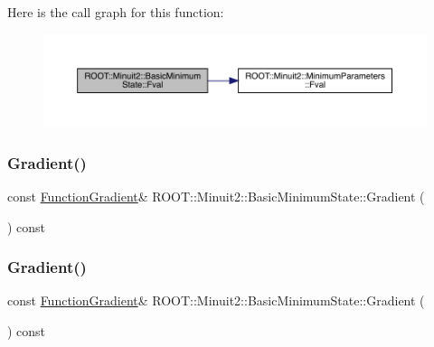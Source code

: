 Here is the call graph for this function\+:
\nopagebreak
\begin{figure}[H]
\begin{center}
\leavevmode
\includegraphics[width=350pt]{d0/db1/classROOT_1_1Minuit2_1_1BasicMinimumState_a5151d99e7c6cd7f3b070ad2c62222010_cgraph}
\end{center}
\end{figure}
\mbox{\label{classROOT_1_1Minuit2_1_1BasicMinimumState_a45b6c728054b409349fb2f6f725a8ab6}} 
\subsubsection{\texorpdfstring{Gradient()}{Gradient()}\hspace{0.1cm}{\footnotesize\ttfamily [1/3]}}
{\footnotesize\ttfamily const \mbox{\hyperlink{classROOT_1_1Minuit2_1_1FunctionGradient}{Function\+Gradient}}\& R\+O\+O\+T\+::\+Minuit2\+::\+Basic\+Minimum\+State\+::\+Gradient (\begin{DoxyParamCaption}{ }\end{DoxyParamCaption}) const\hspace{0.3cm}{\ttfamily [inline]}}

\mbox{\label{classROOT_1_1Minuit2_1_1BasicMinimumState_a45b6c728054b409349fb2f6f725a8ab6}} 
\subsubsection{\texorpdfstring{Gradient()}{Gradient()}\hspace{0.1cm}{\footnotesize\ttfamily [2/3]}}
{\footnotesize\ttfamily const \mbox{\hyperlink{classROOT_1_1Minuit2_1_1FunctionGradient}{Function\+Gradient}}\& R\+O\+O\+T\+::\+Minuit2\+::\+Basic\+Minimum\+State\+::\+Gradient (\begin{DoxyParamCaption}{ }\end{DoxyParamCaption}) const\hspace{0.3cm}{\ttfamily [inline]}}

